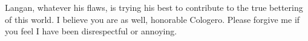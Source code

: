 \begin{footnotesize}
\begin{sffamily}
Langan, whatever his flaws, is trying his best to contribute to the true bettering of this world. I believe you are as well, honorable Cologero. Please forgive me if you feel I have been disrespectful or annoying.


\hfill

\end{sffamily}
\end{footnotesize}

